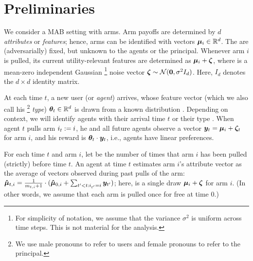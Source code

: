 \section{Preliminaries}
\label{sec:prob}

We consider a MAB setting with \ARMNUM arms.
Arm payoffs are determined by $d$ \emph{attributes} or \emph{features};
hence, arms can be identified with vectors $\ArmV{i} \in \R^d$.
The  are (adversarially) fixed, but unknown to the agents
or the principal.
Whenever arm $i$ is pulled, its current utility-relevant features are
determined as $\ArmV{i} + \NoiseV$, where \NoiseV is a mean-zero independent Gaussian%
\footnote{For simplicity of notation, we assume that the variance
  $\sigma^2$ is uniform across time steps. This is not material for
  the analysis.}
noise vector $\NoiseV \sim \Normal{\vc{0}}{\sigma^2 I_{d}}$.
Here, $I_d$ denotes the $d \times d$ identity matrix.

At each time $t$, a new user (or \emph{agent}) arrives,
whose feature vector (which we also call his%
\footnote{We use male pronouns to refer to users and female pronouns
  to refer to the principal.}
\emph{type}) $\AgentV{t} \in \R^d$ is drawn from a known distribution
\AgentDist.
Depending on context, we will identify agents with their arrival time
$t$ or their type .
When agent $t$ pulls arm $\Pull{t} := i$,
he and all future agents observe a vector
$\ObsV{t} = \ArmV{i} + \NoiseV[t]$ for arm $i$,
and his reward is $\AgentV{t} \cdot \ObsV{t}$,
i.e., agents have linear preferences.

For each time $t$ and arm $i$, let  be the number of
times that arm $i$ has been pulled (strictly) before time $t$.
An agent at time $t$ estimates arm $i$'s attribute vector as the
average of vectors observed during past pulls of the arm:
$\ArmEV{t}{i} = \frac{1}{\NumPull{t}{i}+1} \cdot
(\ArmEV{0}{i} + \sum_{t'<t: \Pull{t'} = i} \ObsV{t'})$;
here,  is a single draw $\ArmV{i} + \NoiseV$ for arm $i$.
(In other words, we assume that each arm is pulled once for free at time 0.)


